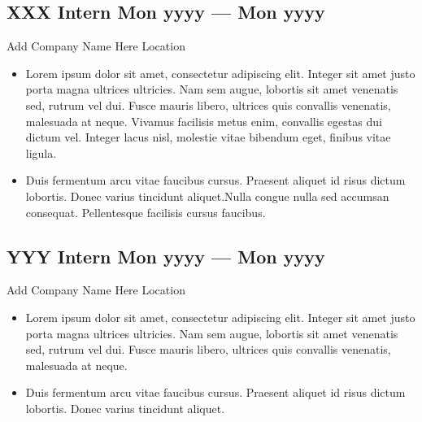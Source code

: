 \documentclass[a4,10pt]{article}
\newcommand{\subtext}[1]{
#1\par\vspace{-0.2cm}}
\newenvironment{zitemize}{
\begin{itemize}\itemsep0pt \parskip0pt \parsep1pt}
{\end{itemize}\vspace{-0.5cm}}
\begin{document}
        

\subsection*{XXX Intern \hfill Mon yyyy --- Mon yyyy} 
\subtext{Add Company Name Here \hfill Location} 
    \begin{zitemize}
        \item Lorem ipsum dolor sit amet, consectetur adipiscing elit. Integer sit amet justo porta magna ultrices ultricies. Nam sem augue, lobortis sit amet venenatis sed, rutrum vel dui. Fusce mauris libero, ultrices quis convallis venenatis, malesuada at neque. Vivamus facilisis metus enim, convallis egestas dui dictum vel. Integer lacus nisl, molestie vitae bibendum eget, finibus vitae ligula. 
        \item Duis fermentum arcu vitae faucibus cursus. Praesent aliquet id risus dictum lobortis. Donec varius tincidunt aliquet.Nulla congue nulla sed accumsan consequat. Pellentesque facilisis cursus faucibus.
    \end{zitemize}


\subsection*{YYY Intern \hfill Mon yyyy --- Mon yyyy} 
\subtext{Add Company Name Here \hfill Location} 
    \begin{zitemize}
        \item Lorem ipsum dolor sit amet, consectetur adipiscing elit. Integer sit amet justo porta magna ultrices ultricies. Nam sem augue, lobortis sit amet venenatis sed, rutrum vel dui. Fusce mauris libero, ultrices quis convallis venenatis, malesuada at neque. 
        \item Duis fermentum arcu vitae faucibus cursus. Praesent aliquet id risus dictum lobortis. Donec varius tincidunt aliquet.
    \end{zitemize}
\end{document}
